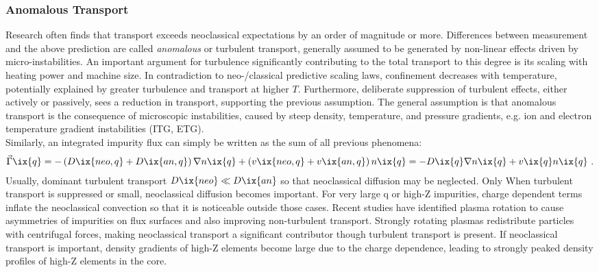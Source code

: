             \subsubsection*{Anomalous Transport}%
%
                Research often finds that transport exceeds neoclassical expectations by an order of magnitude or more. Differences between measurement and the above prediction are called \textit{anomalous} or turbulent transport, generally assumed to be generated by non-linear effects driven by micro-instabilities. An important argument for turbulence significantly contributing to the total transport to this degree is its scaling with heating power and machine size. In contradiction to neo-/classical predictive scaling laws, confinement decreases with temperature, potentially explained by greater turbulence and transport at higher $T$. Furthermore, deliberate suppression of turbulent effects, either actively or passively, sees a reduction in transport, supporting the previous assumption. The general assumption is that anomalous transport is the consequence of microscopic instabilities, caused by steep density, temperature, and pressure gradients, e.g. ion and electron temperature gradient instabilities (ITG, ETG)\cite{Balescu2005,Milligen2004}.\\%
                Similarly, an integrated impurity flux can simply be written as the sum of all previous phenomena:%
%
                \begin{align}%
                    \vec{\Gamma}\ix{q}=-\left(D\ix{neo,q}+D\ix{an,q}\right)\nabla n\ix{q}+\left(v\ix{neo,q}+v\ix{an,q}\right)n\ix{q}=-D\ix{q}\nabla n\ix{q}+v\ix{q}n\ix{q}\,\,.\nonumber%
                \end{align}%
%
                Usually, dominant turbulent transport $D\ix{neo}\ll D\ix{an}$ so that neoclassical diffusion may be neglected. Only When turbulent transport is suppressed or small, neoclassical diffusion becomes important. For very large q or high-Z impurities, charge dependent terms inflate the neoclassical convection so that it is noticeable outside those cases. Recent studies have identified plasma rotation to cause asymmetries of impurities on flux surfaces and also improving non-turbulent transport. Strongly rotating plasmas redistribute particles with centrifugal forces, making neoclassical transport a significant contributor though turbulent transport is present. If neoclassical transport is important, density gradients of high-Z elements become large due to the charge dependence, leading to strongly peaked density profiles of high-Z elements in the core\cite{Garcia2006,Langenberg2019}.%
%
